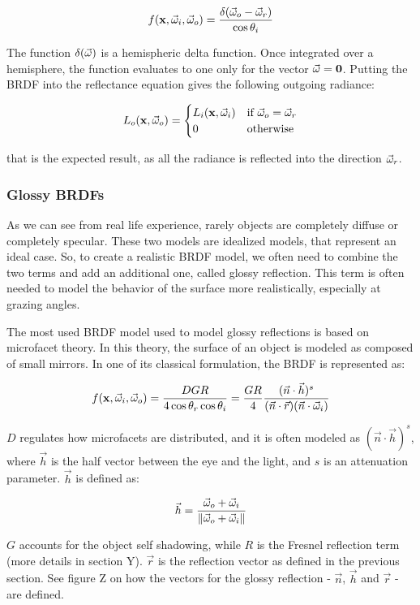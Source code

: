 $$
f(\mathbf{x}, \vec{\omega}_i, \vec{\omega}_o) = \frac{\delta(\vec{\omega}_o - \vec{\omega}_r)}{\cos\theta_i} 
$$

The function $\delta(\vec{\omega})$ is a hemispheric delta function. Once integrated over a hemisphere, the function evaluates to one only for the vector $\vec{\omega} = \mathbf{0}$. Putting the BRDF into the reflectance equation gives the following outgoing radiance:

\begin{equation*}
L_o(\mathbf{x}, \vec{\omega}_o) = \begin{cases}
L_i(\mathbf{x}, \vec{\omega}_i)  &\text{if $\vec{\omega}_o = \vec{\omega}_r$}\\
0 &\text{otherwise}
\end{cases}
\end{equation*}

that is the expected result, as all the radiance is reflected into the direction $\vec{\omega}_r$.

\subsubsection{Glossy BRDFs}

As we can see from real life experience, rarely objects are completely diffuse or completely specular. These two models are idealized models, that represent an ideal case. So, to create a realistic BRDF model, we often need to combine the two terms and add an additional one, called glossy reflection. This term is often needed to model the behavior of the surface more realistically, especially at grazing angles.

The most used BRDF model used to model glossy reflections is based on microfacet theory. In this theory, the surface of an object is modeled as composed of small mirrors. In one of its classical formulation, the BRDF is represented as:

$$
f(\mathbf{x}, \vec{\omega}_i, \vec{\omega}_o) = \frac{D G R}{4 \cos\theta_r \cos\theta_i} = \frac{G R}{4} \frac{(\vec{n}\cdot\vec{h})^s}{(\vec{n}\cdot\vec{r})(\vec{n}\cdot\vec{\omega}_i)}
$$

$D$ regulates how microfacets are distributed, and it is often modeled as $(\vec{n}\cdot\vec{h})^s$, where $\vec{h}$ is the half vector between the eye and the light, and $s$ is an attenuation parameter. $\vec{h}$ is defined as:

$$
\vec{h} = \frac{\vec{\omega}_o + \vec{\omega}_i}{\left\| \vec{\omega}_o + \vec{\omega}_i \right\|}
$$

$G$ accounts for the object self shadowing, while $R$ is the Fresnel reflection term (more details in section Y).	$\vec{r}$ is the reflection vector as defined in the previous section. See figure Z on how the vectors for the glossy reflection - $\vec{n}$, $\vec{h}$ and $\vec{r}$ - are defined.

